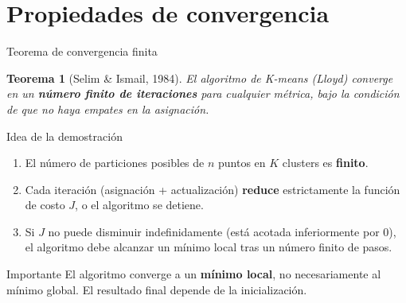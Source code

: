 \documentclass[aspectratio=169]{beamer}
\newtheorem{teorema}{Teorema}
\begin{document}
\section{Propiedades de convergencia}

\begin{frame}{Teorema de convergencia finita}
    \begin{teorema}[Selim \& Ismail, 1984]
        El algoritmo de K-means (Lloyd) converge en un \textbf{número finito de iteraciones} para cualquier métrica, bajo la condición de que no haya empates en la asignación.
    \end{teorema}
    
    \begin{block}{Idea de la demostración}
        \begin{enumerate}
            \item El número de particiones posibles de \(n\) puntos en \(K\) clusters es \textbf{finito}.
            \item Cada iteración (asignación + actualización) \textbf{reduce} estrictamente la función de costo \(J\), o el algoritmo se detiene.
            \item Si \(J\) no puede disminuir indefinidamente (está acotada inferiormente por 0), el algoritmo debe alcanzar un mínimo local tras un número finito de pasos.
        \end{enumerate}
    \end{block}
    
    \begin{alertblock}{Importante}
        El algoritmo converge a un \textbf{mínimo local}, no necesariamente al mínimo global. El resultado final depende de la inicialización.
    \end{alertblock}
\end{frame}
\end{document}
